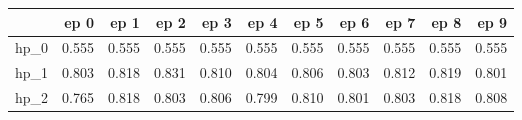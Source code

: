 \begin{tabular}{lrrrrrrrrrr}
\toprule
{} &   ep 0 &   ep 1 &   ep 2 &   ep 3 &   ep 4 &   ep 5 &   ep 6 &   ep 7 &   ep 8 &   ep 9 \\
\midrule
hp\_0 &  0.555 &  0.555 &  0.555 &  0.555 &  0.555 &  0.555 &  0.555 &  0.555 &  0.555 &  0.555 \\
hp\_1 &  0.803 &  0.818 &  0.831 &  0.810 &  0.804 &  0.806 &  0.803 &  0.812 &  0.819 &  0.801 \\
hp\_2 &  0.765 &  0.818 &  0.803 &  0.806 &  0.799 &  0.810 &  0.801 &  0.803 &  0.818 &  0.808 \\
\bottomrule
\end{tabular}
